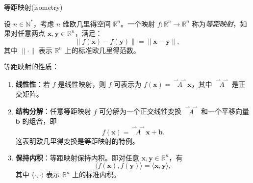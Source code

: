 \documentclass[12pt, a4paper, oneside, UTF8]{ctexbook}  %
\newcommand{\vvec}{\overset{\rightharpoonup\!\!\!\! \rightharpoonup}}
\begin{document}
    \begin{add}
        等距映射(isometry)
    
        设 \( n \in \mathbb{N}^* \)，考虑 \( n \) 维欧几里得空间 \( \mathbb{R}^n \)。一个映射 \( f: \mathbb{R}^n \to \mathbb{R}^n \) 称为\emph{等距映射}，如果对任意两点 \( \mathbf{x}, \mathbf{y} \in \mathbb{R}^n \)，满足：
        \[
            \| f(\mathbf{x}) - f(\mathbf{y}) \| = \| \mathbf{x} - \mathbf{y} \|,
        \]
        其中 \( \| \cdot \| \) 表示 \( \mathbb{R}^n \) 上的标准欧几里得范数。
        
        等距映射的性质：
        \begin{enumerate}
            \item \textbf{线性性}：若 \( f \) 是线性映射，则 \( f \) 可表示为 \( f(\mathbf{x}) = \vvec{A}\mathbf{x} \)，其中 \( \vvec{A} \) 是正交矩阵。
            \item \textbf{结构分解}：任意等距映射 \( f \) 可分解为一个正交线性变换 \( \vvec{A} \) 和一个平移向量 \( \mathbf{b} \) 的组合，即
            \[
                f(\mathbf{x}) = \vvec{A}\mathbf{x} + \mathbf{b}.
            \]
            这表明欧几里得变换是等距映射的特例。
            \item \textbf{保持内积}：等距映射保持内积。即对任意 \( \mathbf{x}, \mathbf{y} \in \mathbb{R}^n \)，有
            \[
                \langle f(\mathbf{x}), f(\mathbf{y}) \rangle = \langle \mathbf{x}, \mathbf{y} \rangle,
            \]
            其中 \( \langle \cdot, \cdot \rangle \) 表示 \( \mathbb{R}^n \) 上的标准内积。
        \end{enumerate}
    \end{add}
\end{document}
